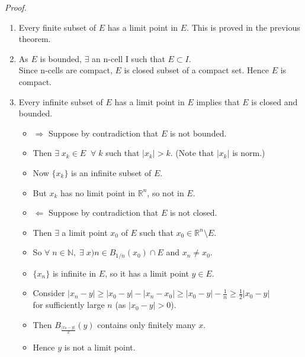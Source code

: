 \documentclass[12pt]{article}
\begin{document}
\newpage
\begin{block}{\sl Proof.}
\begin{enumerate}[label=(\roman*)]
    \item Every finite subset of $E$ has a limit point in $E$. This is proved in the previous theorem.
    \item As $E$ is bounded, $\exists$ an n-cell I such that $E\subset I$. \\
     Since n-cells are compact, $E$ is closed subset of a compact set. Hence $E$ is compact.
    \item Every infinite subset of $E$ has a limit point in $E$ implies that $E$ is closed and bounded.
    \begin{itemize}
        \item $\Rightarrow$ Suppose by contradiction that $E$ is not bounded.
        \item Then $\exists\; x_k\in E\;\;\forall\; k$ such that $|x_k|>k$. (Note that $|x_k|$ is norm.)
        \item Now $\{x_k\}$ is an infinite subset of $E$.
        \item But $x_k$ has no limit point in $\mathbb{R}^n$, so not in $E$.\\
        
        \item $\Leftarrow$ Suppose by contradiction that $E$ is not closed.
        \item Then $\exists$ a limit point $x_0$ of $E$ such that $x_0\in\mathbb{R}^n\setminus E$.
        \item So $\forall\; n\in\mathbb{N},\; \exists\;x)n\in B_{1/n} (x_0) \cap E$ and $x_n\neq x_0$.
        \item $\{x_n\}$ is infinite in $E$, so it has a limit point $y\in E$.
        \item Consider $|x_n-y|\ge |x_0-y|-|x_n-x_0| \ge |x_0-y|-\frac{1}{n}\ge\frac{1}{2}|x_0-y|$\\
        for sufficiently large $n$ (as $|x_0-y|>0$).
        \item Then $B_{\frac{|x_0-y|}{2}}(y)$ contains only finitely many $x$.
        \item Hence $y$ is not a limit point.
    \end{itemize}
\end{enumerate}
\end{block}
\newpage
\end{document}

